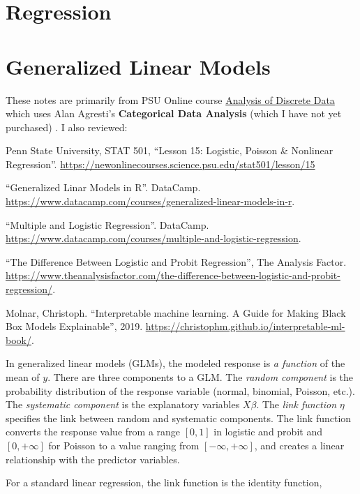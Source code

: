 \documentclass[
]{book}
\begin{document}
\hypertarget{regression}{%
\chapter{Regression}\label{regression}}

\hypertarget{generalized-linear-models}{%
\chapter{Generalized Linear Models}\label{generalized-linear-models}}

These notes are primarily from PSU Online course \href{https://online.stat.psu.edu/stat504}{Analysis of Discrete Data} which uses Alan Agresti's \textbf{Categorical Data Analysis} (which I have not yet purchased) \citep{Agresti2013}. I also reviewed:

Penn State University, STAT 501, ``Lesson 15: Logistic, Poisson \& Nonlinear Regression''. \url{https://newonlinecourses.science.psu.edu/stat501/lesson/15}

``Generalized Linar Models in R''. DataCamp. \url{https://www.datacamp.com/courses/generalized-linear-models-in-r}.

``Multiple and Logistic Regression''. DataCamp. \url{https://www.datacamp.com/courses/multiple-and-logistic-regression}.

``The Difference Between Logistic and Probit Regression'', The Analysis Factor. \url{https://www.theanalysisfactor.com/the-difference-between-logistic-and-probit-regression/}.

Molnar, Christoph. ``Interpretable machine learning. A Guide for Making Black Box Models Explainable'', 2019. \url{https://christophm.github.io/interpretable-ml-book/}.

In generalized linear models (GLMs), the modeled response is \emph{a function} of the mean of \(y\). There are three components to a GLM. The \emph{random component} is the probability distribution of the response variable (normal, binomial, Poisson, etc.). The \emph{systematic component} is the explanatory variables \(X\beta\). The \emph{link function} \(\eta\) specifies the link between random and systematic components. The link function converts the response value from a range \([0,1]\) in logistic and probit and \([0,+\infty]\) for Poisson to a value ranging from \([-\infty, +\infty]\), and creates a linear relationship with the predictor variables.

For a standard linear regression, the link function is the identity function,
\end{document}
